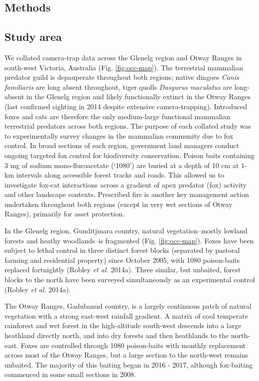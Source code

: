 \documentclass[11pt,a4paper,titlepage,twoside,openright]{style/unimelbthesis}
\begin{document}
\begin{mainmatter}
\newpage

\hypertarget{methods}{%
\section{Methods}\label{methods}}

\hypertarget{study-area}{%
\subsection{Study area}\label{study-area}}

We collated camera-trap data across the Glenelg region and Otway Ranges in south-west Victoria, Australia (Fig. \ref{fig:occ-map}). The terrestrial mammalian predator guild is depauperate throughout both regions; native dingoes \emph{Canis familiaris} are long absent throughout, tiger quolls \emph{Dasyurus maculatus} are long-absent in the Glenelg region and likely functionally extinct in the Otway Ranges (last confirmed sighting in 2014 despite extensive camera-trapping). Introduced foxes and cats are therefore the only medium-large functional mammalian terrestrial predators across both regions. The purpose of each collated study was to experimentally survey changes in the mammalian community due to fox control. In broad sections of each region, government land managers conduct ongoing targeted fox control for biodiversity conservation. Poison baits containing 3 mg of sodium mono-fluroacetate (`1080') are buried at a depth of 10 cm at 1-km intervals along accessible forest tracks and roads. This allowed us to investigate fox-cat interactions across a gradient of apex predator (fox) activity and other landscape contexts. Prescribed fire is another key management action undertaken throughout both regions (except in very wet sections of Otway Ranges), primarily for asset protection.

In the Glenelg region, Gunditjmara country, natural vegetation--mostly lowland forests and heathy woodlands--is fragmented (Fig. \ref{fig:occ-map}). Foxes have been subject to lethal control in three distinct forest blocks (separated by pastoral farming and residential property) since October 2005, with 1080 poison-baits replaced fortnightly (Robley \emph{et al.} 2014a). Three similar, but unbaited, forest blocks to the north have been surveyed simultaneously as an experimental control (Robley \emph{et al.} 2014a).

The Otway Ranges, Gadubanud country, is a largely continuous patch of natural vegetation with a strong east-west rainfall gradient. A matrix of cool temperate rainforest and wet forest in the high-altitude south-west descends into a large heathland directly north, and into dry forests and then heathlands to the north-east. Foxes are controlled through 1080 poison-baits with monthly replacement across most of the Otway Ranges, but a large section to the north-west remains unbaited. The majority of this baiting began in 2016 - 2017, although fox-baiting commenced in some small sections in 2008.


\end{mainmatter}
\end{document}
